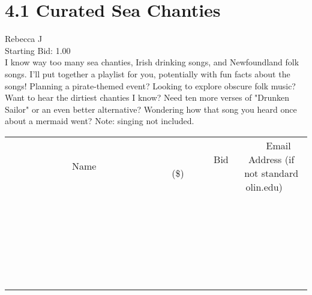 \documentclass[11pt]{article}
\begin{document}
					\section*{4.1 Curated Sea Chanties}
					Rebecca J \\
					Starting Bid: 1.00 \\
					I know way too many sea chanties, Irish drinking songs, and Newfoundland folk songs. I'll put together a playlist for you, potentially with fun facts about the songs!  Planning a pirate-themed event? Looking to explore obscure folk music? Want to hear the dirtiest chanties I know? Need ten more verses of "Drunken Sailor" or an even better alternative? Wondering how that song you heard once about a mermaid went? Note: singing not included. \\
					[6ex]
					\begin{tabular}{c c c}
						~~~~~~~~~~~~~Name~~~~~~~~~~~~~ & ~~~~~~~~~Bid (\$)~~~~~~~~~ & ~~~Email Address (if not standard olin.edu)~~~ \\
				
 & & \\
\hline
 & & \\
\hline
 & & \\
\hline
 & & \\
\hline
 & & \\
\hline
 & & \\
\hline
 & & \\
\hline
 & & \\
\hline
 & & \\
\hline
 & & \\
\hline
 & & \\
\hline
 & & \\
\hline
 & & \\
\hline
 & & \\
\hline
 & & \\
\hline
 & & \\
\hline
 & & \\
\hline
 & & \\
\hline
 & & \\
\hline
 & & \\
\hline
 & & \\
\hline
 & & \\
\hline
 & & \\
\hline
 & & \\
\hline
 & & \\
\hline
 & & \\
\hline
					\end{tabular}
					\clearpage
				
\end{document}

